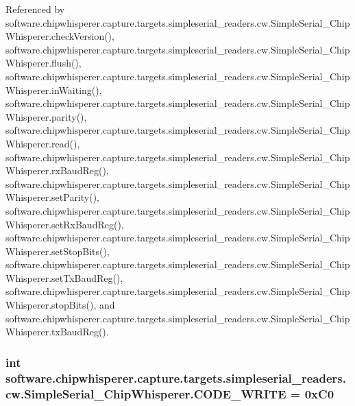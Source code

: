 Referenced by software.\+chipwhisperer.\+capture.\+targets.\+simpleserial\+\_\+readers.\+cw.\+Simple\+Serial\+\_\+\+Chip\+Whisperer.\+check\+Version(), software.\+chipwhisperer.\+capture.\+targets.\+simpleserial\+\_\+readers.\+cw.\+Simple\+Serial\+\_\+\+Chip\+Whisperer.\+flush(), software.\+chipwhisperer.\+capture.\+targets.\+simpleserial\+\_\+readers.\+cw.\+Simple\+Serial\+\_\+\+Chip\+Whisperer.\+in\+Waiting(), software.\+chipwhisperer.\+capture.\+targets.\+simpleserial\+\_\+readers.\+cw.\+Simple\+Serial\+\_\+\+Chip\+Whisperer.\+parity(), software.\+chipwhisperer.\+capture.\+targets.\+simpleserial\+\_\+readers.\+cw.\+Simple\+Serial\+\_\+\+Chip\+Whisperer.\+read(), software.\+chipwhisperer.\+capture.\+targets.\+simpleserial\+\_\+readers.\+cw.\+Simple\+Serial\+\_\+\+Chip\+Whisperer.\+rx\+Baud\+Reg(), software.\+chipwhisperer.\+capture.\+targets.\+simpleserial\+\_\+readers.\+cw.\+Simple\+Serial\+\_\+\+Chip\+Whisperer.\+set\+Parity(), software.\+chipwhisperer.\+capture.\+targets.\+simpleserial\+\_\+readers.\+cw.\+Simple\+Serial\+\_\+\+Chip\+Whisperer.\+set\+Rx\+Baud\+Reg(), software.\+chipwhisperer.\+capture.\+targets.\+simpleserial\+\_\+readers.\+cw.\+Simple\+Serial\+\_\+\+Chip\+Whisperer.\+set\+Stop\+Bits(), software.\+chipwhisperer.\+capture.\+targets.\+simpleserial\+\_\+readers.\+cw.\+Simple\+Serial\+\_\+\+Chip\+Whisperer.\+set\+Tx\+Baud\+Reg(), software.\+chipwhisperer.\+capture.\+targets.\+simpleserial\+\_\+readers.\+cw.\+Simple\+Serial\+\_\+\+Chip\+Whisperer.\+stop\+Bits(), and software.\+chipwhisperer.\+capture.\+targets.\+simpleserial\+\_\+readers.\+cw.\+Simple\+Serial\+\_\+\+Chip\+Whisperer.\+tx\+Baud\+Reg().

\hypertarget{classsoftware_1_1chipwhisperer_1_1capture_1_1targets_1_1simpleserial__readers_1_1cw_1_1SimpleSerial__ChipWhisperer_a72fb88df1724ffc97de6509f2b4c5b41}{}
\subsubsection[{C\+O\+D\+E\+\_\+\+W\+R\+I\+T\+E}]{\setlength{\rightskip}{0pt plus 5cm}int software.\+chipwhisperer.\+capture.\+targets.\+simpleserial\+\_\+readers.\+cw.\+Simple\+Serial\+\_\+\+Chip\+Whisperer.\+C\+O\+D\+E\+\_\+\+W\+R\+I\+T\+E = 0x\+C0\hspace{0.3cm}{\ttfamily [static]}}\label{classsoftware_1_1chipwhisperer_1_1capture_1_1targets_1_1simpleserial__readers_1_1cw_1_1SimpleSerial__ChipWhisperer_a72fb88df1724ffc97de6509f2b4c5b41}


